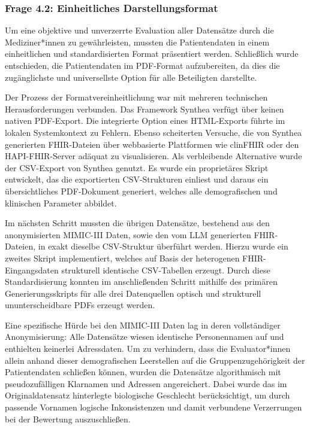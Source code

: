 \subsubsection{Frage 4.2: Einheitliches Darstellungsformat}
\begin{description}[style=nextline, font=\bfseries]

    \item[Methodik] 
    Um eine objektive und unverzerrte Evaluation aller Datensätze durch die Mediziner*innen zu gewährleisten, mussten die Patientendaten in einem einheitlichen und standardisierten Format präsentiert werden. Schließlich wurde entschieden, die Patientendaten im PDF-Format aufzubereiten, da dies die zugänglichste und universellste Option für alle Beteiligten darstellte.

    \item[Hürden] 
    Der Prozess der Formatvereinheitlichung war mit mehreren technischen Herausforderungen verbunden. Das Framework Synthea verfügt über keinen nativen PDF-Export. Die integrierte Option eines HTML-Exports führte im lokalen Systemkontext zu Fehlern. Ebenso scheiterten Versuche, die von Synthea generierten FHIR-Dateien über webbasierte Plattformen wie clinFHIR oder den HAPI-FHIR-Server adäquat zu visualisieren. Als verbleibende Alternative wurde der CSV-Export von Synthea genutzt. Es wurde ein proprietäres Skript entwickelt, das die exportierten CSV-Strukturen einliest und daraus ein übersichtliches PDF-Dokument generiert, welches alle demografischen und klinischen Parameter abbildet.

    Im nächsten Schritt mussten die übrigen Datensätze, bestehend aus den anonymisierten MIMIC-III Daten, sowie den vom LLM generierten FHIR-Dateien, in exakt dieselbe CSV-Struktur überführt werden. Hierzu wurde ein zweites Skript implementiert, welches auf Basis der heterogenen FHIR-Eingangsdaten strukturell identische CSV-Tabellen erzeugt. Durch diese Standardisierung konnten im anschließenden Schritt mithilfe des primären Generierungsskripts für alle drei Datenquellen optisch und strukturell ununterscheidbare PDFs erzeugt werden.

    Eine spezifische Hürde bei den MIMIC-III Daten lag in deren vollständiger Anonymisierung: Alle Datensätze wiesen identische Personennamen auf und enthielten keinerlei Adressdaten. Um zu verhindern, dass die Evaluator*innen allein anhand dieser demografischen Leerstellen auf die Gruppenzugehörigkeit der Patientendaten schließen können, wurden die Datensätze algorithmisch mit pseudozufälligen Klarnamen und Adressen angereichert. Dabei wurde das im Originaldatensatz hinterlegte biologische Geschlecht berücksichtigt, um durch passende Vornamen logische Inkonsistenzen und damit verbundene Verzerrungen bei der Bewertung auszuschließen.


\end{description}
